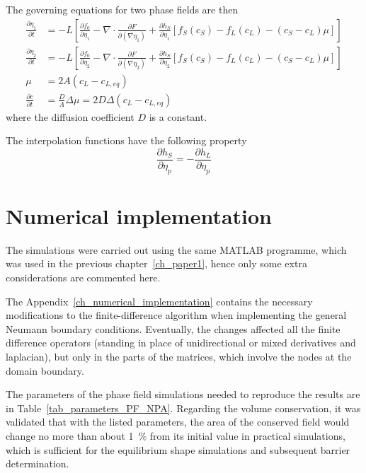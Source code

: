 		The governing equations for two phase fields are then
		\begin{align}
			\frac{\partial \eta_1}{\partial t} &= -L\left[\frac{\partial f_0}{\partial \eta_1} - \nabla\cdot \frac{\partial F}{\partial (\nabla\eta_1)} + \frac{\partial h_S}{\partial \eta_1}[f_S(c_S) - f_L(c_L) - (c_S-c_L)\mu] \right] \\
			\frac{\partial \eta_2}{\partial t} &= -L\left[\frac{\partial f_0}{\partial \eta_2} - \nabla\cdot \frac{\partial F}{\partial (\nabla\eta_2)} + \frac{\partial h_S}{\partial \eta_2}[f_S(c_S) - f_L(c_L) - (c_S-c_L)\mu] \right] \\
			\mu &= 2A(c_L-c_{L,eq})\\
			\frac{\partial c}{\partial t} &= \frac{D}{A}\Delta\mu  = 2D\Delta(c_L-c_{L,eq})
		\end{align}
		where the diffusion coefficient $D$ is a constant.
		
		The interpolation functions have the following property
		\begin{equation}
			\frac{\partial h_S}{\partial \eta_p} = -\frac{\partial h_L}{\partial \eta_p}
		\end{equation}
		

\section{Numerical implementation}
The simulations were carried out using the same MATLAB programme, which was used in the previous chapter~\ref{ch_paper1}, hence only some extra considerations are commented here.

The Appendix~\ref{ch_numerical_implementation} contains the necessary modifications to the finite-difference algorithm when implementing the general Neumann boundary conditions. Eventually, the changes affected all the finite difference operators (standing in place of unidirectional or mixed derivatives and laplacian), but only in the parts of the matrices, which involve the nodes at the domain boundary.

The parameters of the phase field simulations needed to reproduce the results are in Table~\ref{tab_parameters_PF_NPA}. Regarding the volume conservation, it was validated that with the listed parameters, the area of the conserved field would change no more than about 1~\% from its initial value in practical simulations, which is sufficient for the equilibrium shape simulations and subsequent barrier determination.

